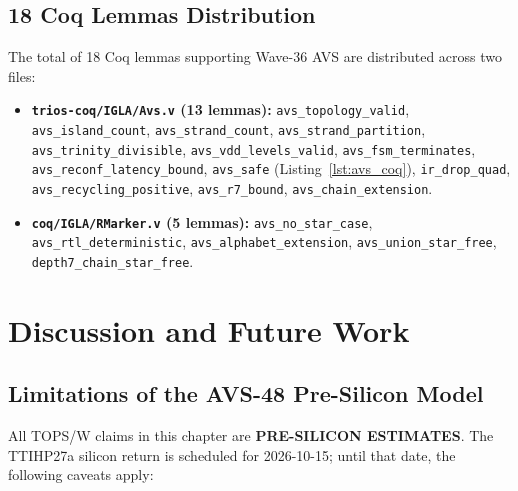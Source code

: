 \subsection{18 Coq Lemmas Distribution}

The total of 18 Coq lemmas supporting Wave-36 AVS are distributed
across two files:

\begin{itemize}
  \item \textbf{\texttt{trios-coq/IGLA/Avs.v} (13 lemmas):}
    \texttt{avs\_topology\_valid},
    \texttt{avs\_island\_count},
    \texttt{avs\_strand\_count},
    \texttt{avs\_strand\_partition},
    \texttt{avs\_trinity\_divisible},
    \texttt{avs\_vdd\_levels\_valid},
    \texttt{avs\_fsm\_terminates},
    \texttt{avs\_reconf\_latency\_bound},
    \texttt{avs\_safe} (Listing~\ref{lst:avs_coq}),
    \texttt{ir\_drop\_quad},
    \texttt{avs\_recycling\_positive},
    \texttt{avs\_r7\_bound},
    \texttt{avs\_chain\_extension}.
  \item \textbf{\texttt{coq/IGLA/RMarker.v} (5 lemmas):}
    \texttt{avs\_no\_star\_case},
    \texttt{avs\_rtl\_deterministic},
    \texttt{avs\_alphabet\_extension},
    \texttt{avs\_union\_star\_free},
    \texttt{depth7\_chain\_star\_free}.
\end{itemize}

\section{Discussion and Future Work}
\label{sec:discussion}

\subsection{Limitations of the AVS-48 Pre-Silicon Model}

All TOPS/W claims in this chapter are \textbf{PRE-SILICON ESTIMATES}.
The TTIHP27a silicon return is scheduled for 2026-10-15; until that
date, the following caveats apply:

